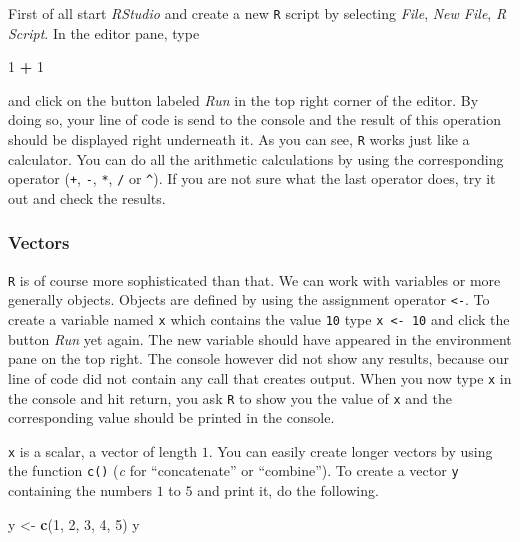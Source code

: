 \documentclass[]{book}
\newenvironment{Shaded}{\begin{snugshade}}{\end{snugshade}}
\newcommand{\KeywordTok}[1]{\textcolor[rgb]{0.13,0.29,0.53}{\textbf{#1}}}
\newcommand{\DecValTok}[1]{\textcolor[rgb]{0.00,0.00,0.81}{#1}}
\newcommand{\StringTok}[1]{\textcolor[rgb]{0.31,0.60,0.02}{#1}}
\newcommand{\OperatorTok}[1]{\textcolor[rgb]{0.81,0.36,0.00}{\textbf{#1}}}
\newcommand{\NormalTok}[1]{#1}
\theoremstyle{definition}
\theoremstyle{definition}
\theoremstyle{definition}
\theoremstyle{remark}
\begin{document}
First of all start \emph{RStudio} and create a new \texttt{R} script by
selecting \emph{File}, \emph{New File}, \emph{R Script}. In the editor
pane, type

\begin{Shaded}
\begin{Highlighting}[]
\DecValTok{1} \OperatorTok{+}\StringTok{ }\DecValTok{1}
\end{Highlighting}
\end{Shaded}

and click on the button labeled \emph{Run} in the top right corner of
the editor. By doing so, your line of code is send to the console and
the result of this operation should be displayed right underneath it. As
you can see, \texttt{R} works just like a calculator. You can do all the
arithmetic calculations by using the corresponding operator (\texttt{+},
\texttt{-}, \texttt{*}, \texttt{/} or \texttt{\textasciicircum{}}). If
you are not sure what the last operator does, try it out and check the
results.

\subsubsection*{Vectors}\label{vectors}

\texttt{R} is of course more sophisticated than that. We can work with
variables or more generally objects. Objects are defined by using the
assignment operator \texttt{<-}. To create a variable named \texttt{x}
which contains the value \texttt{10} type \texttt{x\ \textless{}-\ 10}
and click the button \emph{Run} yet again. The new variable should have
appeared in the environment pane on the top right. The console however
did not show any results, because our line of code did not contain any
call that creates output. When you now type \texttt{x} in the console
and hit return, you ask \texttt{R} to show you the value of \texttt{x}
and the corresponding value should be printed in the console.

\texttt{x} is a scalar, a vector of length \(1\). You can easily create
longer vectors by using the function \texttt{c()} (\emph{c} for
``concatenate'' or ``combine''). To create a vector \texttt{y}
containing the numbers \(1\) to \(5\) and print it, do the following.

\begin{Shaded}
\begin{Highlighting}[]
\NormalTok{y <-}\StringTok{ }\KeywordTok{c}\NormalTok{(}\DecValTok{1}\NormalTok{, }\DecValTok{2}\NormalTok{, }\DecValTok{3}\NormalTok{, }\DecValTok{4}\NormalTok{, }\DecValTok{5}\NormalTok{)}
\NormalTok{y}
\end{Highlighting}
\end{Shaded}
\end{document}
